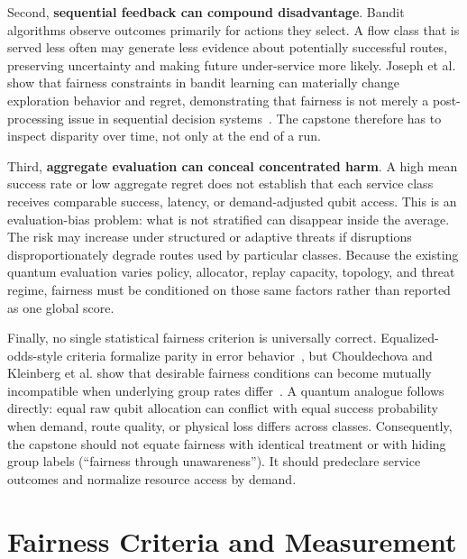 \documentclass[conference]{IEEEtran}
\begin{document}
Second, \textbf{sequential feedback can compound disadvantage}. Bandit algorithms observe outcomes primarily for actions they select. A flow class that is served less often may generate less evidence about potentially successful routes, preserving uncertainty and making future under-service more likely. Joseph et al. show that fairness constraints in bandit learning can materially change exploration behavior and regret, demonstrating that fairness is not merely a post-processing issue in sequential decision systems~\cite{joseph2016fairness}. The capstone therefore has to inspect disparity over time, not only at the end of a run.

Third, \textbf{aggregate evaluation can conceal concentrated harm}. A high mean success rate or low aggregate regret does not establish that each service class receives comparable success, latency, or demand-adjusted qubit access. This is an evaluation-bias problem: what is not stratified can disappear inside the average. The risk may increase under structured or adaptive threats if disruptions disproportionately degrade routes used by particular classes. Because the existing quantum evaluation varies policy, allocator, replay capacity, topology, and threat regime, fairness must be conditioned on those same factors rather than reported as one global score.

Finally, no single statistical fairness criterion is universally correct. Equalized-odds-style criteria formalize parity in error behavior~\cite{hardt2016equality}, but Chouldechova and Kleinberg et al. show that desirable fairness conditions can become mutually incompatible when underlying group rates differ~\cite{chouldechova2017fair,kleinberg2017tradeoffs}. A quantum analogue follows directly: equal raw qubit allocation can conflict with equal success probability when demand, route quality, or physical loss differs across classes. Consequently, the capstone should not equate fairness with identical treatment or with hiding group labels (``fairness through unawareness''). It should predeclare service outcomes and normalize resource access by demand.

\section{Fairness Criteria and Measurement}
\end{document}
